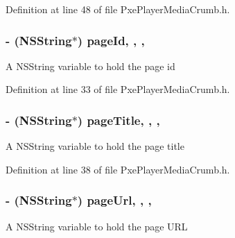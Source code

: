 Definition at line 48 of file Pxe\-Player\-Media\-Crumb.\-h.

\hypertarget{interface_pxe_player_media_crumb_a9f010f5e636db55248d7e556b11ee372}{
\subsubsection[{page\-Id}]{\setlength{\rightskip}{0pt plus 5cm}-\/ (N\-S\-String$\ast$) page\-Id\hspace{0.3cm}{\ttfamily [read]}, {\ttfamily [write]}, {\ttfamily [nonatomic]}, {\ttfamily [strong]}}}\label{interface_pxe_player_media_crumb_a9f010f5e636db55248d7e556b11ee372}
A N\-S\-String variable to hold the page id 

Definition at line 33 of file Pxe\-Player\-Media\-Crumb.\-h.

\hypertarget{interface_pxe_player_media_crumb_a757ee56ef803a58fdbb6e609132ccfcf}{
\subsubsection[{page\-Title}]{\setlength{\rightskip}{0pt plus 5cm}-\/ (N\-S\-String$\ast$) page\-Title\hspace{0.3cm}{\ttfamily [read]}, {\ttfamily [write]}, {\ttfamily [nonatomic]}, {\ttfamily [strong]}}}\label{interface_pxe_player_media_crumb_a757ee56ef803a58fdbb6e609132ccfcf}
A N\-S\-String variable to hold the page title 

Definition at line 38 of file Pxe\-Player\-Media\-Crumb.\-h.

\hypertarget{interface_pxe_player_media_crumb_a032ff36d5fb4c487998aff6e3d476a73}{
\subsubsection[{page\-Url}]{\setlength{\rightskip}{0pt plus 5cm}-\/ (N\-S\-String$\ast$) page\-Url\hspace{0.3cm}{\ttfamily [read]}, {\ttfamily [write]}, {\ttfamily [nonatomic]}, {\ttfamily [strong]}}}\label{interface_pxe_player_media_crumb_a032ff36d5fb4c487998aff6e3d476a73}
A N\-S\-String variable to hold the page U\-R\-L 

